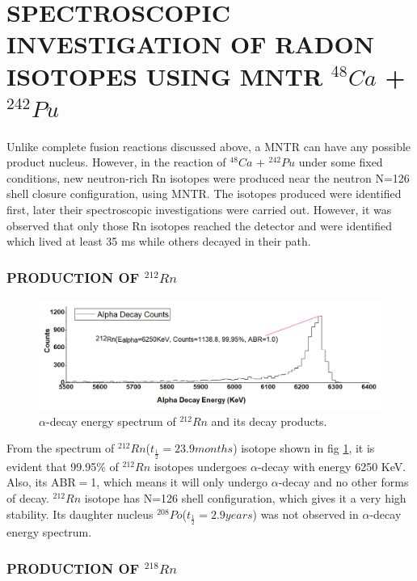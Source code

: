 \documentclass[12pt]{article}
\begin{document}
\section{SPECTROSCOPIC INVESTIGATION OF RADON ISOTOPES USING MNTR $^{48}Ca$ + $^{242}Pu$}
Unlike complete fusion reactions discussed above, a MNTR can have any possible product nucleus. However, in the reaction of $^{48}Ca$ + $^{242}Pu$ under some fixed conditions, new neutron-rich Rn isotopes were produced near the neutron N=126 shell closure configuration, using MNTR. The isotopes produced were identified first, later their spectroscopic investigations were carried out. However, it was observed that only those Rn isotopes reached the detector and were identified which lived at least 35 ms while others decayed in their path. 


\subsubsection{PRODUCTION OF $^{212}Rn$}
\begin{figure}[h]
\centering
\includegraphics[scale=0.5]{Rn212.png}
\caption{$\alpha$-decay energy spectrum of $^{212}Rn$ and its decay products.}
\label{alpha-decay energy spectrum of 212Rn and its decay products.}
\end{figure}

From the spectrum of $^{212}Rn$($t_\frac{1}{2}=23.9 months$) isotope shown in fig \ref{alpha-decay energy spectrum of 212Rn and its decay products.}, it is evident that 99.95\% of $^{212}Rn$ isotopes undergoes $\alpha$-decay with energy 6250 KeV. Also, its ABR$=$1, which means it will only undergo $\alpha$-decay and no other forms of decay. $^{212}Rn$ isotope has N=126 shell configuration, which gives it a very high stability. Its daughter nucleus $^{208}Po$($t_\frac{1}{2}=2.9 years$)
was not observed in $\alpha$-decay energy spectrum.
 

\subsubsection{PRODUCTION OF $^{218}Rn$}
\end{document}
